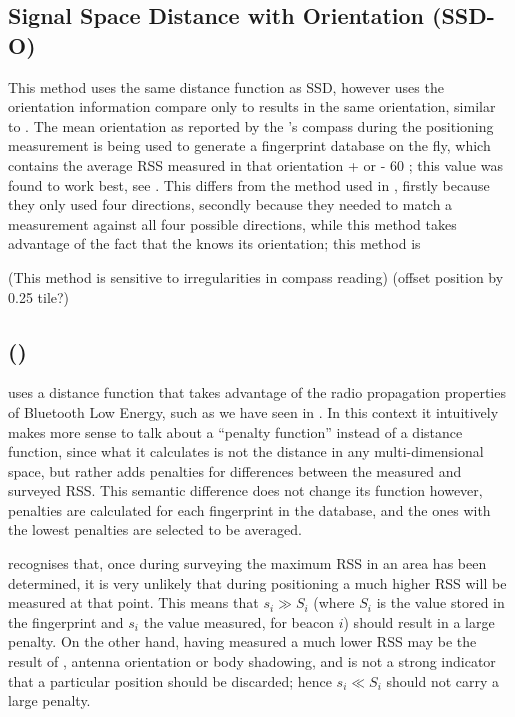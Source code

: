 \subsection{Signal Space Distance with Orientation (SSD-O)}
This method uses the same distance function as SSD, however uses the orientation information compare only to results in the same orientation, similar to \citet{king2006compass}.
The mean orientation as reported by the \device's compass during the positioning measurement is being used to generate a fingerprint database on the fly, which contains the average RSS measured in that orientation + or - 60 \textdegree{}; this value was found to work best, see .
This differs from the method used in \citet{bahl2000radar}, firstly because they only used four directions, secondly because they needed to match a measurement against all four possible directions, while this method takes advantage of the fact that the \device knows its orientation; this method is 

(This method is sensitive to irregularities in compass reading)
(offset position by 0.25 tile?)

\subsection{\BRP (\aBRP)}
\BRP uses a distance function that takes advantage of the radio propagation properties of Bluetooth Low Energy, such as we have seen in .
In this context it intuitively makes more sense to talk about a ``penalty function'' instead of a distance function, since what it calculates is not the distance in any multi-dimensional space, but rather adds penalties for differences between the measured and surveyed RSS.
This semantic difference does not change its function however, penalties are calculated for each fingerprint in the database, and the ones with the lowest penalties are selected to be averaged.

\BRP recognises that, once during surveying the maximum RSS in an area has been determined, it is very unlikely that during positioning a much higher RSS will be measured at that point.
This means that $s_i \gg S_i$ (where $S_i$ is the value stored in the fingerprint and $s_i$ the value measured, for beacon $i$) should result in a large penalty.
On the other hand, having measured a much lower RSS may be the result of \mpi, antenna orientation or body shadowing, and is not a strong indicator that a particular position should be discarded; hence $s_i \ll S_i$ should not carry a large penalty.

